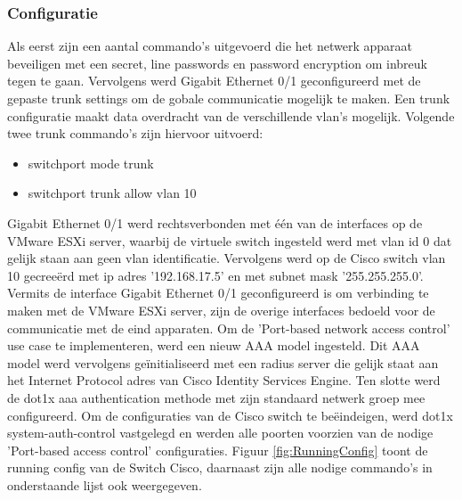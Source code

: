 \subsubsection{Configuratie}
\label{sec:config}
Als eerst zijn een aantal commando's uitgevoerd die het netwerk apparaat beveiligen met een secret, line passwords en password encryption om inbreuk tegen te gaan. Vervolgens werd Gigabit Ethernet 0/1 geconfigureerd met de gepaste trunk settings om de gobale communicatie mogelijk te maken. Een trunk configuratie maakt data overdracht van de verschillende vlan's mogelijk. Volgende twee trunk commando's zijn hiervoor uitvoerd:  

\begin{itemize}
	\item switchport mode trunk
	\item switchport trunk allow vlan 10 
\end{itemize}

Gigabit Ethernet 0/1 werd rechtsverbonden met één van de interfaces op de VMware ESXi server, waarbij de virtuele switch ingesteld werd met vlan id 0 dat gelijk staan aan geen vlan identificatie. Vervolgens werd
op de Cisco switch vlan 10 gecreeërd met ip adres '192.168.17.5' en met subnet mask '255.255.255.0'. Vermits de interface Gigabit Ethernet 0/1 geconfigureerd is om verbinding te maken met de VMware ESXi server, zijn de overige interfaces bedoeld voor de communicatie met de eind apparaten. 
\newline
\newline
Om de 'Port-based network access control' use case te implementeren, werd een nieuw AAA model ingesteld. Dit AAA model werd vervolgens geïnitialiseerd met een radius server die gelijk staat aan het Internet Protocol adres van Cisco Identity Services Engine. Ten slotte werd de dot1x aaa authentication methode met zijn standaard netwerk groep mee configureerd. 
\newline
\newline
Om de configuraties van de Cisco switch te beëindeigen, werd dot1x system-auth-control vastgelegd en werden alle poorten voorzien van de nodige 'Port-based access control' configuraties. Figuur \ref{fig:RunningConfig} toont de running config van de Switch Cisco, daarnaast zijn alle nodige commando's in onderstaande lijst ook weergegeven.

